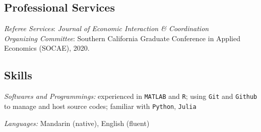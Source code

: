 \documentclass[letterpaper]{article}
\renewenvironment{itemize}{
  \begin{list}{}{
    \setlength{\leftmargin}{1.5em}
    \setlength{\itemsep}{0.25em}
    \setlength{\parskip}{0pt}
    \setlength{\parsep}{0.25em}
  }
}{
  \end{list}
}
\begin{document}


\subsection*{\bf Professional Services}
{\it Referee Services}: \textit{Journal of Economic Interaction \& Coordination}\\
{\it Organizing Committee}: Southern California Graduate Conference in Applied Economics (SOCAE), 2020.

\subsection*{\bf Skills}

\begin{itemize}
  \item {\it Softwares and Programmings:} experienced in {\tt MATLAB} and {\tt R}; using {\tt Git} and {\tt Github} to manage and host source codes; familiar with {\tt Python}, {\tt Julia}
  \item {\it Languages:} Mandarin (native), English (fluent)
\end{itemize}


\end{document}
